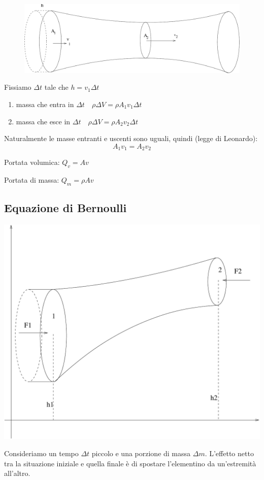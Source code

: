 \begin{figure}[htbp]
   \centering
   \includegraphics[scale=0.4]{immagini/fisica1/equazione_continuita}
\end{figure}
Fissiamo $\Delta t$ tale che $h=v_1\Delta t$
\begin{enumerate}
   \item massa che entra in $\Delta t\quad \rho\Delta V=\rho A_1v_1\Delta t$
   \item massa che esce in $\Delta t\quad \rho\Delta V=\rho A_2v_2\Delta t$
\end{enumerate}
Naturalmente le masse entranti e uscenti sono uguali, quindi (legge di Leonardo):
\[A_1v_1=A_2v_2\]

Portata volumica: $Q_v=Av$

Portata di massa: $Q_m=\rho Av$

\subsection{Equazione di Bernoulli}


\begin{center}
   \includegraphics[scale=0.4]{immagini/fisica1/Bernoulli}
\end{center}
Consideriamo un tempo $\Delta t$ piccolo e una porzione di massa $\Delta m$. L'effetto netto tra la situazione iniziale e quella finale è di spostare l'elementino da un'estremità all'altro.

